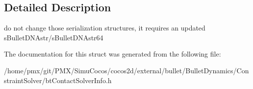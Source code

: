 \subsection{Detailed Description}
do not change those serialization structures, it requires an updated s\+Bullet\+D\+N\+Astr/s\+Bullet\+D\+N\+Astr64 

The documentation for this struct was generated from the following file\+:\begin{DoxyCompactItemize}
\item 
/home/pmx/git/\+P\+M\+X/\+Simu\+Cocos/cocos2d/external/bullet/\+Bullet\+Dynamics/\+Constraint\+Solver/bt\+Contact\+Solver\+Info.\+h\end{DoxyCompactItemize}
